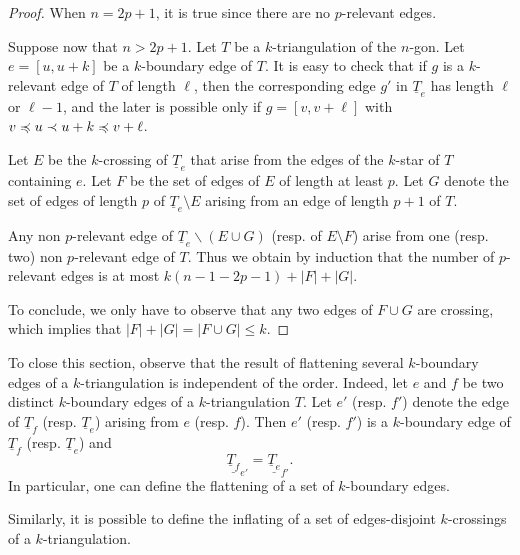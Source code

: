 \documentclass[12pt]{amsart}
\begin{document}
\begin{proof}
When $n=2p+1$, it is true since there are no $p$-relevant edges.

Suppose now that $n>2p+1$. Let $T$ be a $k$-triangulation of the $n$-gon. Let $e=[u,u+k]$ be a $k$-boundary edge of $T$. It is easy to check that if $g$ is a $k$-relevant edge of $T$ of length $\ell$, then the corresponding edge $g'$ in $\underline{T}_e$ has length $\ell$ or $\ell-1$, and the later is possible only if $g=[v,v+\ell]$ with $v\preccurlyeq u\prec u+k\preccurlyeq v+\ell$.

Let $E$ be the $k$-crossing of $\underline{T}_e$ that arise from the edges of the $k$-star of $T$ containing $e$. Let $F$ be the set of edges of $E$ of length at least $p$. Let $G$ denote the set of edges of length $p$ of $\underline{T}_e\setminus E$ arising from an edge of length $p+1$ of $T$.

Any non $p$-relevant edge of $\underline{T}_e\smallsetminus (E\cup G)$ (resp. of $E\setminus F$) arise from one (resp. two) non $p$-relevant edge of $T$. Thus we obtain by induction that the number of $p$-relevant edges is at most $k(n-1-2p-1)+|F|+|G|$.

To conclude, we only have to observe that any two edges of $F\cup G$ are crossing, which implies that $|F|+|G|=|F\cup G|\le k$.
\end{proof}





To close this section, observe that the result of flattening several $k$-boundary edges of a $k$-triangulation is independent of the order.
Indeed, let $e$ and $f$ be two distinct $k$-boundary edges of a $k$-triangulation $T$. Let $e'$ (resp. $f'$) denote the edge of $\underline{T}_f$ (resp. $\underline{T}_e$) arising from $e$ (resp. $f$). Then $e'$ (resp. $f'$) is a $k$-boundary edge of $\underline{T}_f$ (resp. $\underline{T}_e$) and
$$\underline{\underline{T}_f}_{e'}=\underline{\underline{T}_e}_{f'}.$$
In particular, one can define the flattening of a set of $k$-boundary edges. 

Similarly, it is possible to define the inflating of a set of edges-disjoint $k$-crossings of a $k$-triangulation.
\end{document}
